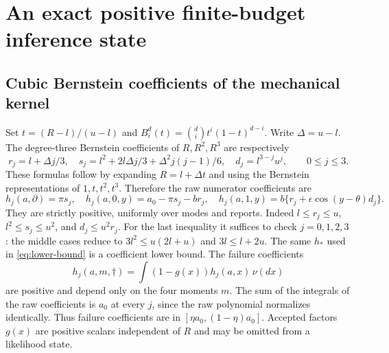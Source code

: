 \section{An exact positive finite-budget inference state}\label{sec:filter}
\subsection{Cubic Bernstein coefficients of the mechanical kernel}
Set $t=(R-l)/(u-l)$ and
$B_i^d(t)=\binom di t^i(1-t)^{d-i}$. Write $\Delta=u-l$.
The degree-three Bernstein coefficients of $R,R^2,R^3$ are respectively
\begin{equation}
 r_j=l+\Delta j/3,\quad
 s_j=l^2+2l\Delta j/3+\Delta^2j(j-1)/6,\quad
 d_j=l^{3-j}u^j,\qquad 0\le j\le3.
 \label{eq:elementary-coefficients}
\end{equation}
These formulas follow by expanding $R=l+\Delta t$ and using the Bernstein
representations of $1,t,t^2,t^3$. Therefore the raw numerator coefficients are
\begin{equation}
 h_j(a,\partial)=\pi s_j,\quad
 h_j(a,0,y)=a_0-\pi s_j-br_j,\quad
 h_j(a,1,y)=b\{r_j+\epsilon\cos(y-\theta)d_j\}.
 \label{eq:raw-coefficients}
\end{equation}
They are strictly positive, uniformly over modes and reports. Indeed
$l\le r_j\le u$, $l^2\le s_j\le u^2$, and $d_j\le u^2r_j$.
For the last inequality it suffices to check $j=0,1,2,3$: the middle cases
reduce to $3l^2\le u(2l+u)$ and $3l\le l+2u$.
The same $h_*$ used in \eqref{eq:lower-bound} is a coefficient lower bound.
The failure coefficients
\begin{equation}
 h_j(a,m,\dagger)=\int(1-g(x))h_j(a,x)\,\nu(dx)
 \label{eq:failure-coefficients}
\end{equation}
are positive and depend only on the four moments $m$. The sum of the
integrals of the raw coefficients is $a_0$ at every $j$, since the raw
polynomial normalizes identically. Thus failure coefficients are in
$[\eta a_0,(1-\eta)a_0]$. Accepted factors $g(x)$ are positive scalars
independent of $R$ and may be omitted from a likelihood state.


